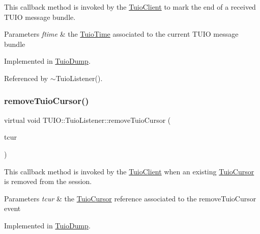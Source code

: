 This callback method is invoked by the \hyperlink{class_t_u_i_o_1_1_tuio_client}{Tuio\+Client} to mark the end of a received T\+U\+IO message bundle.


\begin{DoxyParams}{Parameters}
{\em ftime} & the \hyperlink{class_t_u_i_o_1_1_tuio_time}{Tuio\+Time} associated to the current T\+U\+IO message bundle \\
\hline
\end{DoxyParams}


Implemented in \hyperlink{class_tuio_dump_a8a664f2e278fac90065c57e366d4277e}{Tuio\+Dump}.



Referenced by $\sim$\+Tuio\+Listener().

\mbox{\label{class_t_u_i_o_1_1_tuio_listener_ade7712d189c28c82c447a815022254d9}} 
\subsubsection{\texorpdfstring{remove\+Tuio\+Cursor()}{removeTuioCursor()}}
{\footnotesize\ttfamily virtual void T\+U\+I\+O\+::\+Tuio\+Listener\+::remove\+Tuio\+Cursor (\begin{DoxyParamCaption}\item[{\hyperlink{class_t_u_i_o_1_1_tuio_cursor}{Tuio\+Cursor} $\ast$}]{tcur }\end{DoxyParamCaption})\hspace{0.3cm}{\ttfamily [pure virtual]}}

This callback method is invoked by the \hyperlink{class_t_u_i_o_1_1_tuio_client}{Tuio\+Client} when an existing \hyperlink{class_t_u_i_o_1_1_tuio_cursor}{Tuio\+Cursor} is removed from the session.


\begin{DoxyParams}{Parameters}
{\em tcur} & the \hyperlink{class_t_u_i_o_1_1_tuio_cursor}{Tuio\+Cursor} reference associated to the remove\+Tuio\+Cursor event \\
\hline
\end{DoxyParams}


Implemented in \hyperlink{class_tuio_dump_a29bea77556080ef3a2efea2d20b17b54}{Tuio\+Dump}.



